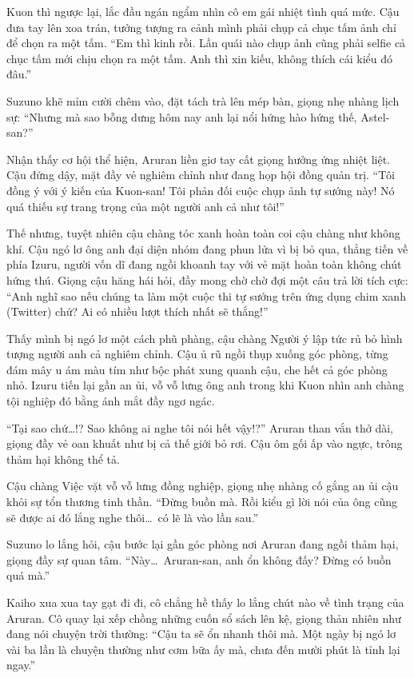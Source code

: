 \documentclass[../main.tex]{subfiles}
\begin{document}
Kuon thì ngược lại, lắc đầu ngán ngẩm nhìn cô em gái nhiệt tình quá mức. Cậu đưa tay lên xoa trán, tưởng tượng ra cảnh mình phải chụp cả chục tấm ảnh chỉ để chọn ra một tấm. ``Em thì kinh rồi. Lần quái nào chụp ảnh cũng phải selfie cả chục tấm mới chịu chọn ra một tấm. Anh thì xin kiếu, không thích cái kiểu đó đâu.''

Suzuno khẽ mỉm cười chêm vào, đặt tách trà lên mép bàn, giọng nhẹ nhàng lịch sự: ``Nhưng mà sao bỗng dưng hôm nay anh lại nổi hứng hào hứng thế, Astel-san?''

Nhận thấy cơ hội thể hiện, Aruran liền giơ tay cất giọng hưởng ứng nhiệt liệt. Cậu đứng dậy, mặt đầy vẻ nghiêm chỉnh như đang họp hội đồng quản trị. ``Tôi đồng ý với ý kiến của Kuon-san! Tôi phản đối cuộc chụp ảnh tự sướng này! Nó quá thiếu sự trang trọng của một người anh cả như tôi!''


Thế nhưng, tuyệt nhiên cậu chàng tóc xanh hoàn toàn coi cậu chàng như không khí. Cậu ngó lơ ông anh đại diện nhóm đang phun lửa vì bị bỏ qua, thẳng tiến về phía Izuru, người vốn dĩ đang ngồi khoanh tay với vẻ mặt hoàn toàn không chút hứng thú. Giọng cậu hăng hái hỏi, đầy mong chờ chờ đợi một câu trả lời tích cực: ``Anh nghĩ sao nếu chúng ta làm một cuộc thi tự sướng trên ứng dụng chim xanh (Twitter) chứ? Ai có nhiều lượt thích nhất sẽ thắng!''

Thấy mình bị ngó lơ một cách phũ phàng, cậu chàng Người ý lập tức rủ bỏ hình tượng người anh cả nghiêm chỉnh. Cậu ủ rũ ngồi thụp xuống góc phòng, từng đám mây u ám màu tím như bộc phát xung quanh cậu, che hết cả góc phòng nhỏ. Izuru tiến lại gần an ủi, vỗ vỗ lưng ông anh trong khi Kuon nhìn anh chàng tội nghiệp đó bằng ánh mắt đầy ngơ ngác.

``Tại sao chứ\dots!? Sao không ai nghe tôi nói hết vậy!?'' Aruran than vắn thở dài, giọng đầy vẻ oan khuất như bị cả thế giới bỏ rơi. Cậu ôm gối ấp vào ngực, trông thảm hại không thể tả.


Cậu chàng Việc vặt vỗ vỗ lưng đồng nghiệp, giọng nhẹ nhàng cố gắng an ủi cậu khỏi sự tổn thương tinh thần. ``Đừng buồn mà. Rồi kiểu gì lời nói của ông cũng sẽ được ai đó lắng nghe thôi\dots\ có lẽ là vào lần sau.''

Suzuno lo lắng hỏi, cậu bước lại gần góc phòng nơi Aruran đang ngồi thảm hại, giọng đầy sự quan tâm. ``Này\dots\ Aruran-san, anh ổn không đấy? Đừng có buồn quá mà.''

Kaiho xua xua tay gạt đi đi, cô chẳng hề thấy lo lắng chút nào về tình trạng của Aruran. Cô quay lại xếp chồng những cuốn sổ sách lên kệ, giọng thản nhiên như đang nói chuyện trời thường: ``Cậu ta sẽ ổn nhanh thôi mà. Một ngày bị ngó lơ vài ba lần là chuyện thường như cơm bữa ấy mà, chưa đến mười phút là tỉnh lại ngay.''
\end{document}
